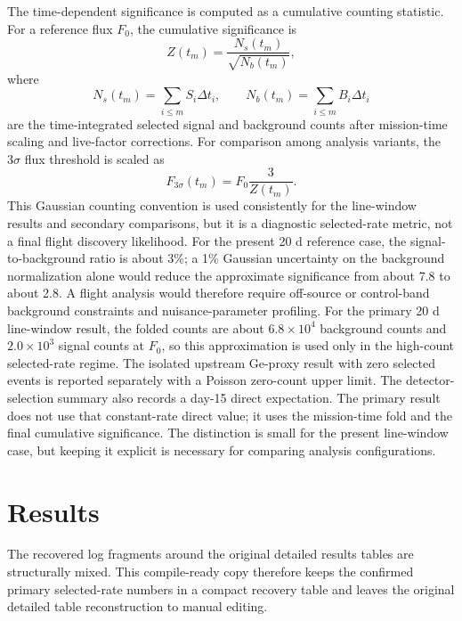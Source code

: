 \documentclass[11pt]{article}
\newcommand{\fzero}{F_{0}}
\newcommand{\fthree}{F_{3\sigma}}
\begin{document}
The time-dependent significance is computed as a cumulative counting statistic. For a reference flux $\fzero$, the cumulative significance is
\begin{equation}
  Z(t_m) = \frac{N_s(t_m)}{\sqrt{N_b(t_m)}},
\end{equation}
where
\begin{equation}
  N_s(t_m)=\sum_{i\leq m}S_i\Delta t_i,\qquad
  N_b(t_m)=\sum_{i\leq m}B_i\Delta t_i
\end{equation}
are the time-integrated selected signal and background counts after
mission-time scaling and live-factor corrections. For comparison among
analysis variants, the $3\sigma$ flux threshold is scaled as
\begin{equation}
  \fthree(t_m) = \fzero \frac{3}{Z(t_m)}.
\end{equation}
This Gaussian counting convention is used consistently for the line-window
results and secondary comparisons, but it is a diagnostic selected-rate metric,
not a final flight discovery likelihood. For the present 20 d reference case,
the signal-to-background ratio is about 3\%; a 1\% Gaussian uncertainty on the
background normalization alone would reduce the approximate significance from
about 7.8 to about 2.8. A flight analysis would therefore require off-source
or control-band background constraints and nuisance-parameter profiling.
For the primary 20 d line-window result, the folded counts are about
$6.8\times10^4$ background counts and $2.0\times10^3$ signal counts at
$\fzero$, so this approximation is used only in the high-count selected-rate
regime. The isolated upstream Ge-proxy result with zero selected events is
reported separately with a Poisson zero-count upper limit.
The detector-selection summary also records a day-15 direct expectation. The primary
result does not use that constant-rate direct value; it uses the
mission-time fold and the final cumulative significance. The distinction is
small for the present line-window case, but keeping it explicit is necessary
for comparing analysis configurations.


\section{Results}
\label{sec:results}

The recovered log fragments around the original detailed results tables are structurally mixed. This compile-ready copy therefore keeps the confirmed primary selected-rate numbers in a compact recovery table and leaves the original detailed table reconstruction to manual editing.
\end{document}
